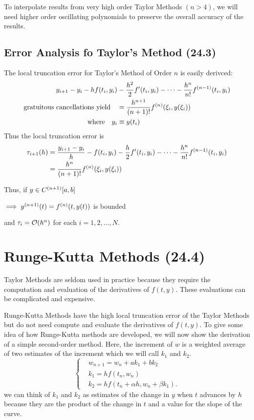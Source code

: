 To interpolate results from very high order Taylor Methods $(n>4)$, we will need
higher order oscillating polynomials to preserve the overall accuracy of the
results.

\subsection{Error Analysis fo Taylor's Method (24.3)}
The local truncation error for Taylor's Method of Order $n$ is easily derivced:
\begin{align*}
  y_{i+1} - y_i - h f\pqty{t_i, y_i} 
    &- \frac{h^2}{2} f'\pqty{t_i, y_i} 
    - \cdots 
    - \frac{h^n}{n!} f^{(n-1)}\pqty{t_i, y_i} \\
    \text{gratuitous cancellations yield}\quad &= \frac{h^{n+1}}{(n+1)!} f^{(n)}\pqty{\xi_i, y\pqty{\xi_i}} \\
  \text{where} \quad y_i &\equiv y\pqty{t_i}
\end{align*}
Thus the local truncation error is
\begin{align*}
  \tau_{i+1}(h) &= \frac{y_{i+1} - y_i}{h} - f\pqty{t_i, y_i} - \frac{h}{2} f'\pqty{t_i, y_i} - \cdots - \frac{h^n}{n!} f^{(n-1)}\pqty{t_i, y_i} \\
                &= \frac{h^n}{(n+1)!} f^{(n)}\pqty{\xi_i, y\pqty{\xi_i}} \\
\end{align*}
{
  Thus, if
  $y \in C^{(n+1)}\bqty{a, b}$

  \hangindent=0.5in
  $\implies y^{(n+1)}(t) = f^{(n)}\pqty{t, y(t)}$ is bounded

  and $\tau_i = \order{h^n}$ for each $i = 1, 2, \dots, N.$
}

\section{Runge-Kutta Methods (24.4)}
Taylor Methods are seldom used in practice because they require the computation
and evaluation of the derivatives of $f(t,y)$. These evaluations can be
complicated and expensive.

Runge-Kutta Methods have the high local truncation error of the Taylor Methods
but do not need compute and evaluate the derivatives of $f(t,y)$. To give some
idea of how Runge-Kutta methods are developed, we will now show the derivation
of a simple second-order method. Here, the increment of $w$ is a weighted
average of two estimates of the increment which we will call $k_1$ and $k_2$.
\[
\begin{cases}
  & w_{n+1} = w_n + ak_1 + bk_2 \\
  & k_1 = hf(t_n, w_n) \\
  & k_2 = hf(t_n + \alpha h, w_n + \beta k_1)
.\end{cases}
\label{eq:rk2}
\]
we can think of $k_1$ and $k_2$ as estimates of the change in $y$ when $t$
advances by $h$ because they are the product of the change in $t$ and a value
for the slope of the curve.

